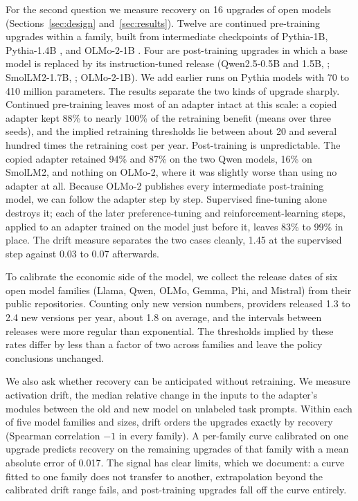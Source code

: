 \documentclass[preprint,12pt,authoryear]{elsarticle}
\begin{document}
For the second question we measure recovery on 16 upgrades of open models (Sections~\ref{sec:design} and~\ref{sec:results}). Twelve are continued pre-training upgrades within a family, built from intermediate checkpoints of Pythia-1B, Pythia-1.4B \citep{biderman2023pythia}, and OLMo-2-1B \citep{olmo2024olmo2}. Four are post-training upgrades in which a base model is replaced by its instruction-tuned release (Qwen2.5-0.5B and 1.5B, \citealt{qwen2024qwen25}; SmolLM2-1.7B, \citealt{allal2025smollm2}; OLMo-2-1B). We add earlier runs on Pythia models with 70 to 410 million parameters. The results separate the two kinds of upgrade sharply. Continued pre-training leaves most of an adapter intact at this scale: a copied adapter kept 88\% to nearly 100\% of the retraining benefit (means over three seeds), and the implied retraining thresholds lie between about 20 and several hundred times the retraining cost per year. Post-training is unpredictable. The copied adapter retained 94\% and 87\% on the two Qwen models, 16\% on SmolLM2, and nothing on OLMo-2, where it was slightly worse than using no adapter at all. Because OLMo-2 publishes every intermediate post-training model, we can follow the adapter step by step. Supervised fine-tuning alone destroys it; each of the later preference-tuning and reinforcement-learning steps, applied to an adapter trained on the model just before it, leaves 83\% to 99\% in place. The drift measure separates the two cases cleanly, 1.45 at the supervised step against 0.03 to 0.07 afterwards.

To calibrate the economic side of the model, we collect the release dates of six open model families (Llama, Qwen, OLMo, Gemma, Phi, and Mistral) from their public repositories. Counting only new version numbers, providers released 1.3 to 2.4 new versions per year, about 1.8 on average, and the intervals between releases were more regular than exponential. The thresholds implied by these rates differ by less than a factor of two across families and leave the policy conclusions unchanged.

We also ask whether recovery can be anticipated without retraining. We measure activation drift, the median relative change in the inputs to the adapter's modules between the old and new model on unlabeled task prompts. Within each of five model families and sizes, drift orders the upgrades exactly by recovery (Spearman correlation $-1$ in every family). A per-family curve calibrated on one upgrade predicts recovery on the remaining upgrades of that family with a mean absolute error of 0.017. The signal has clear limits, which we document: a curve fitted to one family does not transfer to another, extrapolation beyond the calibrated drift range fails, and post-training upgrades fall off the curve entirely.
\end{document}
